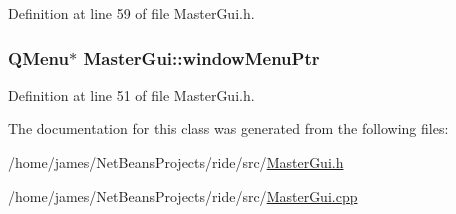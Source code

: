 Definition at line 59 of file Master\-Gui.\-h.

\hypertarget{class_master_gui_ae33b742ac5529096317c8096984ffef1}{
\subsubsection[{window\-Menu\-Ptr}]{\setlength{\rightskip}{0pt plus 5cm}Q\-Menu$\ast$ Master\-Gui\-::window\-Menu\-Ptr\hspace{0.3cm}{\ttfamily [private]}}}\label{class_master_gui_ae33b742ac5529096317c8096984ffef1}


Definition at line 51 of file Master\-Gui.\-h.



The documentation for this class was generated from the following files\-:\begin{DoxyCompactItemize}
\item 
/home/james/\-Net\-Beans\-Projects/ride/src/\hyperlink{_master_gui_8h}{Master\-Gui.\-h}\item 
/home/james/\-Net\-Beans\-Projects/ride/src/\hyperlink{_master_gui_8cpp}{Master\-Gui.\-cpp}\end{DoxyCompactItemize}
